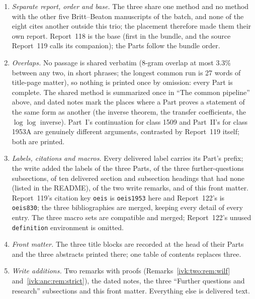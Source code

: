 \documentclass[11pt,letterpaper]{article}
\theoremstyle{remark}\newtheorem{remark}[theorem]{Remark}
\begin{document}
\begin{enumerate}
\item \emph{Separate report, order and base.} The three share one method and no method with the other five Britt--Beaton manuscripts of the batch, and none of the eight cites another outside this trio; the placement therefore made them their own report. Report~118 is the base (first in the bundle, and the source Report~119 calls its companion); the Parts follow the bundle order.
\item \emph{Overlaps.} No passage is shared verbatim (8-gram overlap at most 3.3\% between any two, in short phrases; the longest common run is 27 words of title-page matter), so nothing is printed once by omission: every Part is complete. The shared method is summarized once in ``The common pipeline'' above, and dated notes mark the places where a Part proves a statement of the same form as another (the inverse theorem, the transfer coefficients, the $\log\log$ inverse). Part~I's continuation for class 1509 and Part~II's for class 1953A are genuinely different arguments, contrasted by Report~119 itself; both are printed.
\item \emph{Labels, citations and macros.} Every delivered label carries its Part's prefix; the write added the labels of the three Parts, of the three further-questions subsections, of ten delivered section and subsection headings that had none (listed in the README), of the two write remarks, and of this front matter. Report~119's citation key \texttt{oeis} is \texttt{oeis1953} here and Report~122's is \texttt{oeis830}; the three bibliographies are merged, keeping every detail of every entry. The three macro sets are compatible and merged; Report~122's unused \texttt{definition} environment is omitted.
\item \emph{Front matter.} The three title blocks are recorded at the head of their Parts and the three abstracts printed there; one table of contents replaces three.
\item \emph{Write additions.} Two remarks with proofs (Remarks~\ref{ivk:two:rem:wilf} and~\ref{ivk:anc:rem:strict}), the dated notes, the three ``Further questions and research'' subsections and this front matter. Everything else is delivered text.
\end{enumerate}
\end{document}
